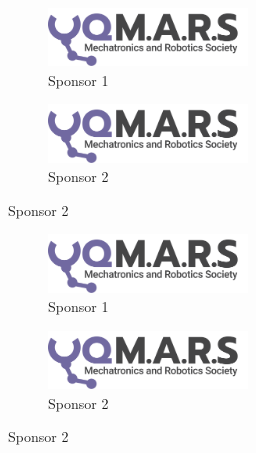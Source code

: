 \documentclass[a4paper,12pt]{report}
\begin{document}
\begin{figure}[!htb]
    \captionsetup[subfigure]{labelformat=empty}
     \centering
        \begin{subfigure}[b]{0.3\textwidth}
        \centering
        \includegraphics[width=200]{Assets/Logo (Dark).png}
        \caption{Sponsor 1}
        \end{subfigure}
     \hfill
        \begin{subfigure}[b]{0.5\textwidth}
        \centering
        \includegraphics[width=200]{Assets/Logo (Dark).png}
        \caption{Sponsor 2}
        \end{subfigure}
\end{figure}

\begin{figure}[!htb]
    \captionsetup[subfigure]{labelformat=empty}
     \centering
        \begin{subfigure}[b]{0.3\textwidth}
        \centering
        \includegraphics[width=200]{Assets/Logo (Dark).png}
        \caption{Sponsor 1}
        \end{subfigure}
     \hfill
        \begin{subfigure}[b]{0.5\textwidth}
        \centering
        \includegraphics[width=200]{Assets/Logo (Dark).png}
        \caption{Sponsor 2}
        \end{subfigure}
\end{figure}
\end{document}
